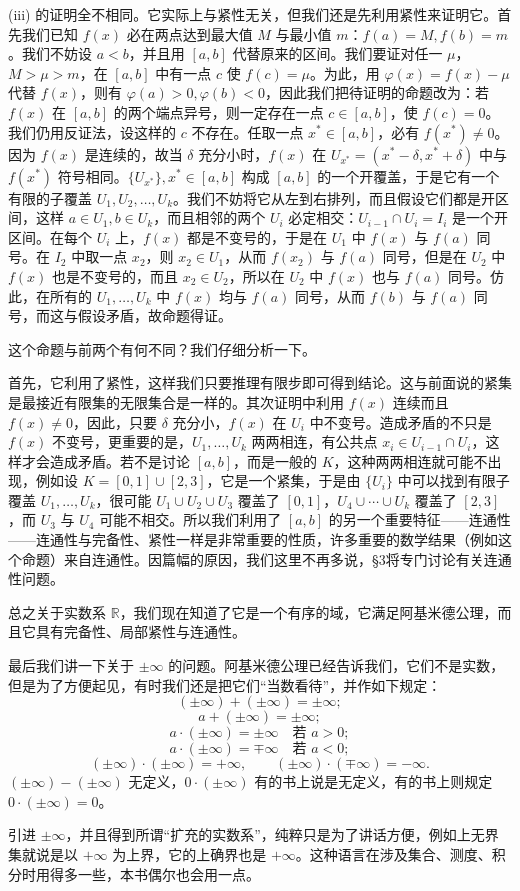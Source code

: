 (iii) 的证明全不相同。它实际上与紧性无关，但我们还是先利用紧性来证明它。首先我们已知 $f(x)$ 必在两点达到最大值 $M$ 与最小值 $m$：$f(a)=M,f(b)=m$。我们不妨设 $a<b$，并且用 $[a,b]$ 代替原来的区间。我们要证对任一 $\mu$，$M>\mu>m$，在 $[a,b]$ 中有一点 $c$ 使 $f(c)=\mu$。为此，用 $\varphi(x)=f(x)-\mu$ 代替 $f(x)$，则有 $\varphi(a)>0,\varphi(b)<0$，因此我们把待证明的命题改为：若 $f(x)$ 在 $[a,b]$ 的两个端点异号，则一定存在一点 $c\in[a,b]$，使 $f(c)=0$。我们仍用反证法，设这样的 $c$ 不存在。任取一点 $x^*\in[a,b]$，必有 $f(x^*)\ne0$。因为 $f(x)$ 是连续的，故当 $\delta$ 充分小时，$f(x)$ 在 $U_{x^*}=(x^*-\delta,x^*+\delta)$ 中与 $f(x^*)$ 符号相同。$\{U_{x^*}\},x^*\in[a,b]$ 构成 $[a,b]$ 的一个开覆盖，于是它有一个有限的子覆盖 $U_1,U_2,\ldots,U_k$。我们不妨将它从左到右排列，而且假设它们都是开区间，这样 $a\in U_1,b\in U_k$，而且相邻的两个 $U_i$ 必定相交：$U_{i-1}\cap U_i=I_i$ 是一个开区间。在每个 $U_i$ 上，$f(x)$ 都是不变号的，于是在 $U_1$ 中 $f(x)$ 与 $f(a)$ 同号。在 $I_2$ 中取一点 $x_2$，则 $x_2\in U_1$，从而 $f(x_2)$ 与 $f(a)$ 同号，但是在 $U_2$ 中 $f(x)$ 也是不变号的，而且 $x_2\in U_2$，所以在 $U_2$ 中 $f(x)$ 也与 $f(a)$ 同号。仿此，在所有的 $U_1,\ldots,U_k$ 中 $f(x)$ 均与 $f(a)$ 同号，从而 $f(b)$ 与 $f(a)$ 同号，而这与假设矛盾，故命题得证。

这个命题与前两个有何不同？我们仔细分析一下。

首先，它利用了紧性，这样我们只要推理有限步即可得到结论。这与前面说的紧集是最接近有限集的无限集合是一样的。其次证明中利用 $f(x)$ 连续而且 $f(x)\ne0$，因此，只要 $\delta$ 充分小，$f(x)$ 在 $U_i$ 中不变号。造成矛盾的不只是 $f(x)$ 不变号，更重要的是，$U_1,\ldots,U_k$ 两两相连，有公共点 $x_i\in U_{i-1}\cap U_i$，这样才会造成矛盾。若不是讨论 $[a,b]$，而是一般的 $K$，这种两两相连就可能不出现，例如设 $K=[0,1]\cup[2,3]$，它是一个紧集，于是由 $\{U_i\}$ 中可以找到有限子覆盖 $U_1,\ldots,U_k$，很可能 $U_1\cup U_2\cup U_3$ 覆盖了 $[0,1]$，$U_4\cup\cdots\cup U_k$ 覆盖了 $[2,3]$，而 $U_3$ 与 $U_4$ 可能不相交。所以我们利用了 $[a,b]$ 的另一个重要特征——连通性——连通性与完备性、紧性一样是非常重要的性质，许多重要的数学结果（例如这个命题）来自连通性。因篇幅的原因，我们这里不再多说，§3将专门讨论有关连通性问题。

总之关于实数系 $\mathbb R$，我们现在知道了它是一个有序的域，它满足阿基米德公理，而且它具有完备性、局部紧性与连通性。

最后我们讲一下关于 $\pm\infty$ 的问题。阿基米德公理已经告诉我们，它们不是实数，但是为了方便起见，有时我们还是把它们“当数看待”，并作如下规定：
\[
 (\pm\infty)+(\pm\infty)=\pm\infty;
\]
\[
 a+(\pm\infty)=\pm\infty;
\]
\[
 a\cdot(\pm\infty)=\pm\infty\quad\text{若 }a>0;
\]
\[
 a\cdot(\pm\infty)=\mp\infty\quad\text{若 }a<0;
\]
\[
 (\pm\infty)\cdot(\pm\infty)=+\infty,\qquad (\pm\infty)\cdot(\mp\infty)=-\infty.
\]
$(\pm\infty)-(\pm\infty)$ 无定义，$0\cdot(\pm\infty)$ 有的书上说是无定义，有的书上则规定 $0\cdot(\pm\infty)=0$。

引进 $\pm\infty$，并且得到所谓“扩充的实数系”，纯粹只是为了讲话方便，例如上无界集就说是以 $+\infty$ 为上界，它的上确界也是 $+\infty$。这种语言在涉及集合、测度、积分时用得多一些，本书偶尔也会用一点。
